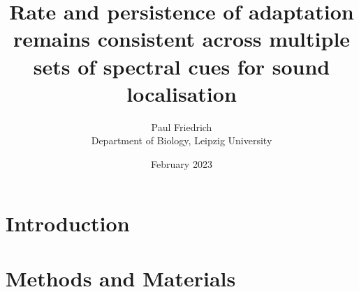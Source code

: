 \documentclass[12pt]{article}
\newcommand\thesistitle{Rate and persistence of adaptation remains consistent across multiple sets of spectral cues for sound localisation}
\begin{document}
\title{\thesistitle}%
\author{Paul Friedrich\\Department of Biology, Leipzig University}
\date{February 2023}
\maketitle

\newpage\section{Introduction}\label{sec1}%


\newpage\section{Methods and Materials}\label{sec2}%




\nocite{*}

%
\end{document}
